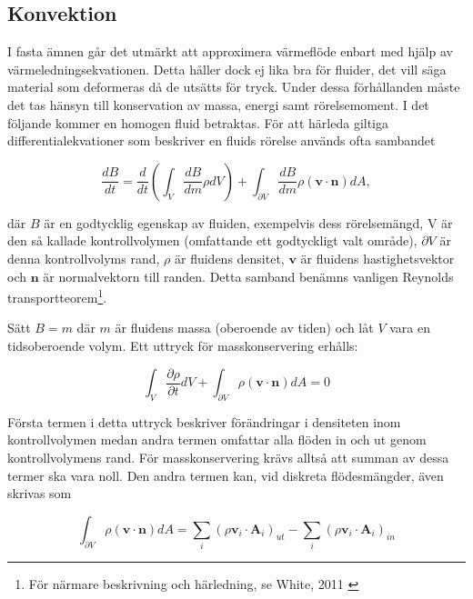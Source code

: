 \subsection{Konvektion}
\label{section:convection}
I fasta ämnen går det utmärkt att approximera värmeflöde enbart med hjälp
av värmeledningsekvationen. Detta håller dock ej lika bra för fluider, det vill säga
material som deformeras då de utsätts för tryck.
Under dessa förhållanden
måste det tas hänsyn till konservation av massa, energi samt rörelsemoment.
I det följande kommer en homogen fluid betraktas. För att härleda giltiga differentialekvationer som beskriver en fluids rörelse används ofta sambandet

\begin{equation}
\label{eq:convection:reynolds}
\frac{dB}{dt} = \frac{d}{dt}\left( \int_{V} \frac{dB}{dm} \rho dV \right) + \int_{\partial V} \frac{dB}{dm} \rho \left( \mathbf{v} \cdot \mathbf{n} \right)dA,
\end{equation}

där $B$ är en godtycklig egenskap av fluiden, exempelvis dess rörelsemängd, V är den så kallade kontrollvolymen (omfattande ett godtyckligt valt område), $\partial V$ är denna kontrollvolyms rand, $\rho$ är fluidens densitet, $\mathbf{v}$ är fluidens hastighetsvektor och $\mathbf{n}$ är normalvektorn till randen. Detta samband benämns vanligen Reynolds transportteorem\footnote{För närmare beskrivning och härledning, se White, 2011 \cite{white11}}.

Sätt $B = m$ där $m$ är fluidens massa (oberoende av tiden) och låt $V$ vara en tidsoberoende volym. Ett uttryck för masskonservering erhålls:

\begin{equation}
\label{eq:convection:masscon}
\int_V \frac{\partial \rho}{\partial t} dV + \int_{\partial V} \rho \left( \mathbf{v} \cdot \mathbf{n} \right) dA = 0
\end{equation}

Första termen i detta uttryck beskriver förändringar i densiteten inom kontrollvolymen medan andra termen omfattar alla flöden in och ut genom kontrollvolymens rand. För masskonservering krävs alltså att summan av dessa termer ska vara noll. Den andra termen kan, vid diskreta flödesmängder, även skrivas som

\begin{equation}
\label{eq:convection:discrete}
\int_{\partial V} \rho \left( \mathbf{v} \cdot \mathbf{n} \right) dA = \sum_i \left( \rho \mathbf{v}_i\cdot \mathbf{A}_i \right)_{ut} - \sum_i \left( \rho \mathbf{v}_i\cdot \mathbf{A}_i \right)_{in}
\end{equation}

